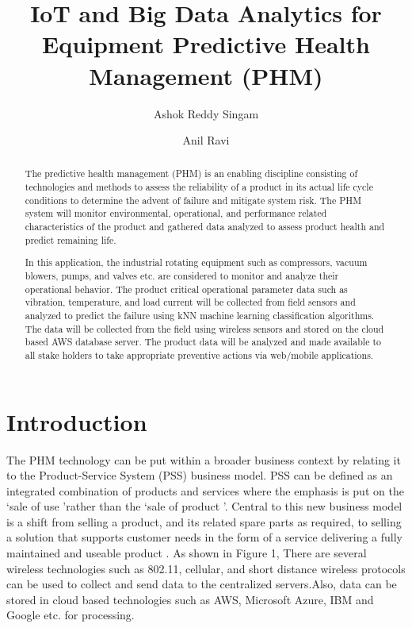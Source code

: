 \documentclass[sigconf]{acmart}
\begin{document}
\title{IoT and Big Data Analytics for Equipment Predictive Health Management (PHM)}
\author{Ashok Reddy Singam}
\author{Anil Ravi}
\begin{abstract}
The predictive health management (PHM) is an enabling discipline consisting of technologies and methods to assess the reliability of a product in its actual life cycle conditions to determine the advent of failure and mitigate system risk. The PHM system will monitor environmental, operational, and performance related characteristics of the product and gathered data analyzed to assess product health and predict remaining life. 

In this application, the industrial rotating equipment such as compressors, vacuum blowers, pumps, and valves etc. are considered to monitor and analyze their operational behavior. The product critical operational parameter data such as vibration, temperature, and load current will be collected from field sensors and analyzed to predict the failure using kNN machine learning classification algorithms. The data will be collected from the field using wireless sensors and stored on the cloud based AWS database server. The product data will be analyzed and made available to all stake holders to take appropriate preventive actions via web/mobile applications.
\end{abstract}
\maketitle
\section{Introduction}
The PHM technology can be put within a broader business context by relating it to the Product-Service System (PSS) business model. PSS can be defined as an integrated combination of products and services where the emphasis is put on the \lq sale of use \rq rather than the \lq sale of product \rq. Central to this new business model is a shift from selling a product, and its related spare parts as required, to selling a solution that supports customer needs in the form of a service delivering a fully maintained and useable product \cite{Tonci2009}. As shown in Figure 1, There are several wireless technologies such as 802.11, cellular, and short distance wireless protocols  can be used to collect and send data to the centralized servers.Also, data can be stored in cloud based technologies such as AWS, Microsoft Azure, IBM and Google etc. for processing. 
\end{document}
